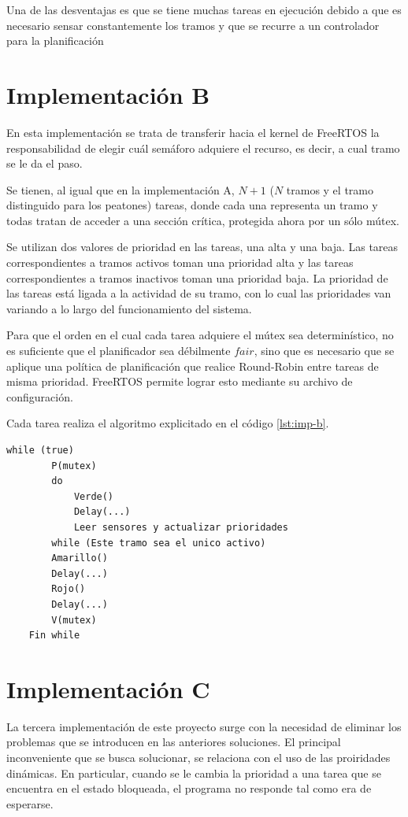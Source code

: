 Una de las desventajas es que se tiene muchas tareas en ejecución debido a que es necesario sensar constantemente los tramos y que se recurre a un controlador para la planificación

\section{Implementación B}
En esta implementación se trata de transferir hacia el kernel de FreeRTOS la responsabilidad de elegir cuál semáforo adquiere el recurso, es decir, a cual tramo se le da el paso.

Se tienen, al igual que en la implementación A, $N + 1$ ($N$ tramos y el tramo distinguido para los peatones) tareas, donde cada una representa un tramo y todas tratan de acceder a una sección crítica, protegida ahora por un sólo mútex.

Se utilizan dos valores de prioridad en las tareas, una alta y una baja. Las tareas correspondientes a tramos activos toman una prioridad alta y las tareas correspondientes a tramos inactivos toman una prioridad baja. La prioridad de las tareas está ligada a la actividad de su tramo, con lo cual las prioridades van variando a lo largo del funcionamiento del sistema.

Para que el orden en el cual cada tarea adquiere el mútex sea determinístico, no es suficiente que el planificador sea débilmente $fair$, sino que es necesario que se aplique una política de planificación que realice Round-Robin entre tareas de misma prioridad. FreeRTOS permite lograr esto mediante su archivo de configuración.

Cada tarea realiza el algoritmo explicitado en el código \ref{lst:imp-b}.

\begin{lstlisting}[label=lst:imp-b, caption=Pseudocódigo del programa que corre cada tarea en la implementación B.]
	while (true)
		P(mutex)
		do
			Verde()
			Delay(...)
			Leer sensores y actualizar prioridades
		while (Este tramo sea el unico activo)
		Amarillo()
		Delay(...)
		Rojo()
		Delay(...)
		V(mutex)
	Fin while
\end{lstlisting}

\section{Implementación C}

La tercera implementación de este proyecto surge con la necesidad de eliminar los problemas que se introducen en las anteriores soluciones.
El principal inconveniente que se busca solucionar, se relaciona con el uso de las proiridades dinámicas.
En particular, cuando se le cambia la prioridad a una tarea que se encuentra en el estado bloqueada, el programa no responde tal como era de esperarse.

